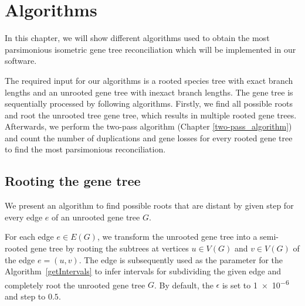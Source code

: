 \chapter{Algorithms} \label{Algorithms}

In this chapter, we will show different algorithms used to obtain the most parsimonious isometric gene tree reconciliation which will be implemented in our software. 

The required input for our algorithms is a rooted species tree with exact branch lengths and an unrooted gene tree with inexact branch lengths. The gene tree is sequentially processed by following algorithms. Firstly, we find all possible roots and root the unrooted tree gene tree, which results in multiple rooted gene trees. Afterwards, we perform the two-pass algorithm (Chapter \ref{two-pass_algorithm}) and count the number of duplications and gene losses for every rooted gene tree to find the most parsimonious reconciliation.

\section{Rooting the gene tree} \label{rooting_the_gene_tree}

We present an algorithm to find possible roots that are distant by given step for every edge $e$ of an unrooted gene tree $G$. 

For each edge $e \in E(G)$, we transform the unrooted gene tree into a semi-rooted gene tree by rooting the subtrees at vertices $u \in V(G)$ and $v \in V(G)$ of the edge $e = (u, v)$. The edge is subsequently used as the parameter for the Algorithm~\ref{getIntervals} to infer intervals for subdividing the given edge and completely root the unrooted gene tree $G$. By default, the $\epsilon$ is set to \num{1e-6} and step to $0.5$.

